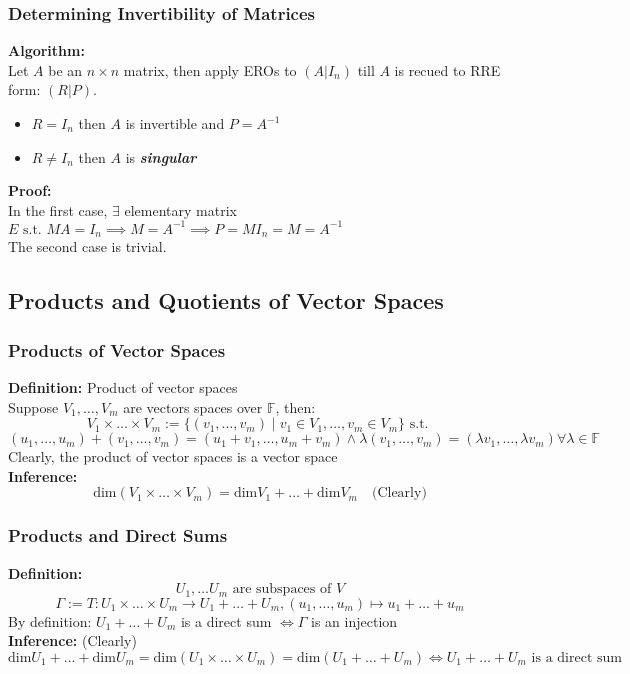 \documentclass{article}
\newcommand{\F}{\mathbb{F}}
\newcommand{\st}{\mbox{ s.t. }}
\newcommand{\0}{{\bf{0}}}
\begin{document}
\subsubsection{Determining Invertibility of Matrices}
\textbf{Algorithm:}\\
Let $A$ be an $n\times n$ matrix, then apply EROs to $(A|I_n)$ till $A$ is recued to RRE form: $(R|P)$.
\begin{itemize}
    \item $R=I_n$ then $A$ is invertible and $P=A^{-1}$
    \item $R\neq I_n$ then $A$ is \textit{\textbf{singular}}
\end{itemize}
\textbf{Proof:}\\
In the first case, $\exists $ elementary matrix $E\st MA=I_n\implies M=A^{-1}\implies P=MI_n=M=A^{-1}$\\
The second case is trivial.
\subsection{Products and Quotients of Vector Spaces}
\subsubsection{Products of Vector Spaces}
\textbf{Definition:} Product of vector spaces\\
Suppose $V_1,\dots,V_m$ are vectors spaces over $\F$, then:
$$V_1\times\dots\times V_m:=\{(v_1,\dots,v_m)\mid v_1\in V_1,\dots,v_m\in V_m\}\st$$
$$(u_1,\dots,u_m)+(v_1,\dots,v_m)=(u_1+v_1,\dots,u_m+v_m)\land\lambda(v_1,\dots,v_m)=(\lambda v_1,\dots,\lambda v_m)\forall\lambda\in\F$$
Clearly, the product of vector spaces is a vector space\\
\textbf{Inference:}
$$\mbox{dim}(V_1\times\dots\times V_m)=\mbox{dim}V_1+\dots+\mbox{dim}V_m\quad\mbox{(Clearly)}$$
\subsubsection{Products and Direct Sums}
\textbf{Definition:}
$$U_1,\dots U_m\mbox{ are subspaces of }V$$
$$\Gamma:=T:U_1\times\dots\times U_m\to U_1+\dots+U_m,(u_1,\dots,u_m)\mapsto u_1+\dots+u_m$$
By definition: $U_1+\dots+U_m$ is a direct sum $\iff\Gamma$ is an injection\\
\textbf{Inference:} (Clearly) $$\mbox{dim}U_1+\dots+\mbox{dim}U_m=\mbox{dim}(U_1\times\dots\times U_m)=\mbox{dim}(U_1+\dots+U_m)\iff U_1+\dots+U_m\mbox{ is a direct sum}$$
\end{document}
